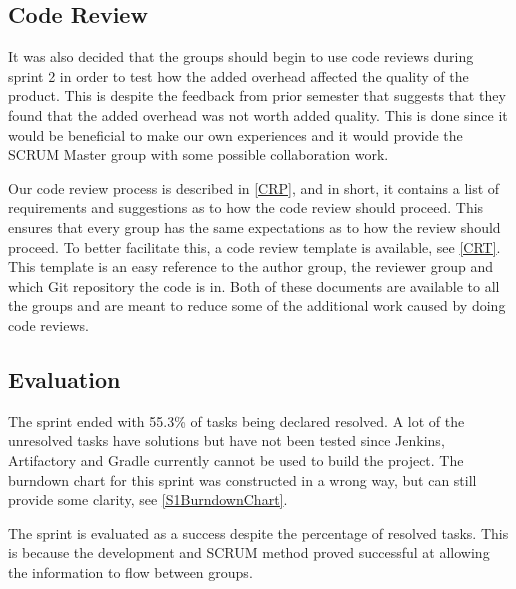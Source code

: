 \subsection{Code Review}
It was also decided that the groups should begin to use code reviews during
sprint 2 in order to test how the added overhead affected the quality of the
product. This is despite the feedback from prior semester that suggests that
they found that the added overhead was not worth added quality. This is done
since it would be beneficial to make our own experiences and it would provide
the SCRUM Master group with some possible collaboration work.\nl

Our code review process is described in \autoref{CRP}, and in short, it contains
a list of requirements and suggestions as to how the code review should proceed.
This ensures that every group has the same expectations as to how the review
should proceed. To better facilitate this, a code review template is available,
see \autoref{CRT}. This template is an easy reference to the author group, the
reviewer group and which Git repository the code is in. Both of these documents
are available to all the groups and are meant to reduce some of the additional
work caused by doing code reviews.

\subsection{Evaluation}

The sprint ended with 55.3\% of tasks being declared resolved. A lot of the
unresolved tasks have solutions but have not been tested since Jenkins,
Artifactory and Gradle currently cannot be used to build the project. The
burndown chart for this sprint was constructed in a wrong way, but can still provide
some clarity, see \autoref{S1BurndownChart}.


The sprint is evaluated as a success despite the percentage of resolved
tasks. This is because the development and SCRUM method proved successful
at allowing the information to flow between groups.




